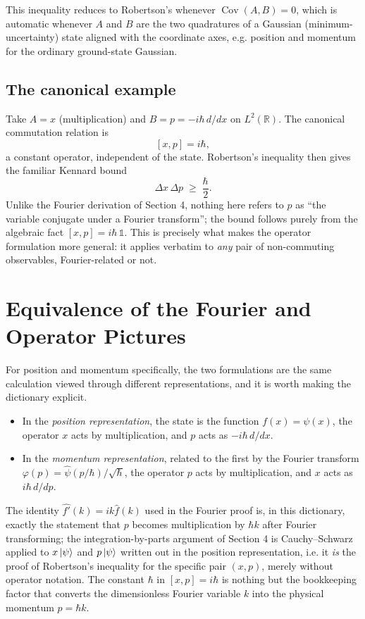 \documentclass[11pt]{article}
\theoremstyle{plain}
\theoremstyle{definition}
\theoremstyle{remark}
\begin{document}
This inequality reduces to Robertson's whenever $\operatorname{Cov}(A,B)=0$, which is automatic
whenever $A$ and $B$ are the two quadratures of a Gaussian (minimum-uncertainty) state aligned
with the coordinate axes, e.g. position and momentum for the ordinary ground-state Gaussian.

\subsection{The canonical example}

Take $A = x$ (multiplication) and $B = p = -i\hbar\, d/dx$ on $L^2(\mathbb{R})$. The canonical
commutation relation is
\[
[x,p] = i\hbar ,
\]
a constant operator, independent of the state. Robertson's inequality then gives the familiar
Kennard bound
\[
\Delta x\, \Delta p \;\geq\; \frac{\hbar}{2}.
\]
Unlike the Fourier derivation of Section 4, nothing here refers to $p$ as ``the variable conjugate
under a Fourier transform''; the bound follows purely from the algebraic fact
$[x,p]=i\hbar\,\mathbb 1$. This is precisely what makes the operator formulation more general: it
applies verbatim to \emph{any} pair of non-commuting observables, Fourier-related or not.

\section{Equivalence of the Fourier and Operator Pictures}

For position and momentum specifically, the two formulations are the same calculation viewed
through different representations, and it is worth making the dictionary explicit.

\begin{itemize}[leftmargin=1.5em]
\item In the \emph{position representation}, the state is the function $f(x)=\psi(x)$, the
operator $x$ acts by multiplication, and $p$ acts as $-i\hbar\, d/dx$.
\item In the \emph{momentum representation}, related to the first by the Fourier transform
$\varphi(p) = \hat\psi(p/\hbar)/\sqrt\hbar$, the operator $p$ acts by multiplication, and $x$
acts as $i\hbar\, d/dp$.
\end{itemize}

The identity $\widehat{f'}(k) = ik\hat f(k)$ used in the Fourier proof is, in this dictionary,
exactly the statement that $p$ becomes multiplication by $\hbar k$ after Fourier transforming;
the integration-by-parts argument of Section 4 is Cauchy--Schwarz applied to $x\ket\psi$ and
$p\ket\psi$ written out in the position representation, i.e. it \emph{is} the proof of Robertson's
inequality for the specific pair $(x,p)$, merely without operator notation. The constant $\hbar$
in $[x,p]=i\hbar$ is nothing but the bookkeeping factor that converts the dimensionless Fourier
variable $k$ into the physical momentum $p=\hbar k$.
\end{document}
